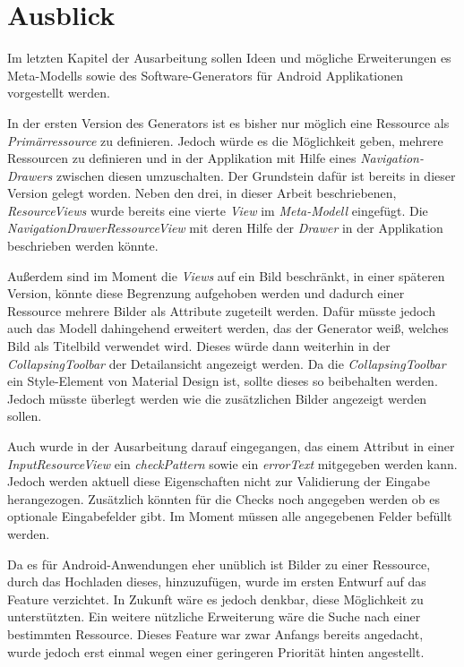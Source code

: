 \section{Ausblick}

Im letzten Kapitel der Ausarbeitung sollen Ideen und mögliche Erweiterungen es Meta-Modells sowie des Software-Generators für Android Applikationen vorgestellt werden.

In der ersten Version des Generators ist es bisher nur möglich eine Ressource als \textit{Primärressource} zu definieren. Jedoch würde es die Möglichkeit geben, mehrere Ressourcen zu definieren und in der Applikation mit Hilfe eines \textit{Navigation-Drawers} zwischen diesen umzuschalten. Der Grundstein dafür ist bereits in dieser Version gelegt worden. Neben den drei, in dieser Arbeit beschriebenen, \textit{ResourceViews} wurde bereits eine vierte \textit{View} im \textit{Meta-Modell} eingefügt. Die \textit{NavigationDrawerRessourceView} mit deren Hilfe der \textit{Drawer} in der Applikation beschrieben werden könnte.

Außerdem sind im Moment die \textit{Views} auf ein Bild beschränkt, in einer späteren Version,  könnte diese Begrenzung  aufgehoben werden und dadurch einer Ressource mehrere Bilder als Attribute zugeteilt werden. Dafür müsste jedoch auch das Modell dahingehend erweitert werden, das der Generator weiß, welches Bild als Titelbild verwendet wird. Dieses würde dann weiterhin in der \textit{CollapsingToolbar} der Detailansicht angezeigt werden. Da die \textit{CollapsingToolbar} ein Style-Element von Material Design ist, sollte dieses so beibehalten werden. Jedoch müsste überlegt werden wie die zusätzlichen Bilder angezeigt werden sollen.

Auch wurde in der Ausarbeitung darauf eingegangen, das einem Attribut in einer \textit{InputResourceView} ein \textit{checkPattern} sowie ein \textit{errorText} mitgegeben werden kann. Jedoch werden aktuell diese Eigenschaften nicht zur Validierung der Eingabe herangezogen. Zusätzlich könnten für die Checks noch angegeben werden ob es optionale Eingabefelder gibt. Im Moment müssen alle angegebenen Felder befüllt werden.

Da es für Android-Anwendungen eher unüblich ist Bilder zu einer Ressource, durch das Hochladen dieses, hinzuzufügen, wurde im ersten Entwurf auf das Feature verzichtet. In Zukunft wäre es jedoch denkbar, diese Möglichkeit zu unterstützten. 
Ein weitere nützliche Erweiterung wäre die Suche nach einer bestimmten Ressource. Dieses Feature war zwar Anfangs bereits angedacht, wurde jedoch erst einmal wegen einer geringeren Priorität hinten angestellt.